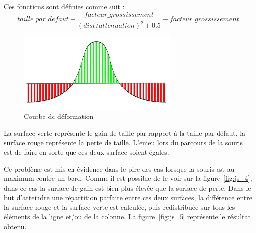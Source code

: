 Ces fonctions sont définies comme suit :
\begin{equation}
taille\_par\_defaut + \frac{facteur\_grossissement}{(dist/attenuation)^{2}+0.5}-facteur\_grossissement
\end{equation}

\begin{figure}[H]
  \centering
  \includegraphics[width=0.7\textwidth]{../resources/illustrations/js_3}
  \caption{Courbe de déformation}
    \label{fig:js_3}
\end{figure}

La surface verte représente le gain de taille par rapport à la taille par défaut, la surface rouge représente la perte de taille. L'enjeu lors du parcours de la souris est de faire en sorte que ces deux surface soient égales.

Ce problème est mis en évidence dans le pire des cas lorsque la souris
est au maximum contre un bord. Comme il est possible de le voir sur la
figure~\ref{fig:js_4}, dans ce cas la surface de gain est bien plus
élevée que la surface de perte. Dans le but d'atteindre une
répartition parfaite entre ces deux surfaces, la différence entre la
surface rouge et la surface verte est calculée, puis   redistribuée
sur tous les éléments de la ligne et/ou de la colonne. La figure~\ref{fig:js_5} représente le résultat obtenu.

